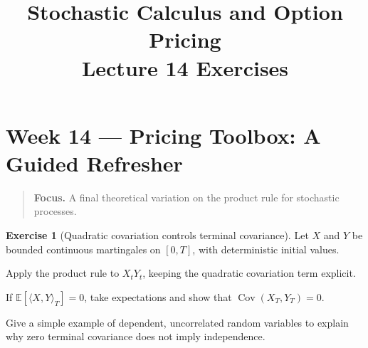 \documentclass[11pt]{article}
\title{Stochastic Calculus and Option Pricing\\Lecture 14 Exercises}
\author{}
\date{}
\newcommand{\E}{\mathbb E}
\theoremstyle{definition}
\newtheorem{exercise}{Exercise}[section]
\newcommand{\lecturesummary}[1]{\begin{quote}\small\textbf{Focus.} #1\end{quote}}
\begin{document}
\maketitle
\vspace{-1.2em}
\setcounter{section}{13}
\fi

\section{Week 14 --- Pricing Toolbox: A Guided Refresher}
\lecturesummary{A final theoretical variation on the product rule for
stochastic processes.}

\begin{exercise}[Quadratic covariation controls terminal covariance]
Let \(X\) and \(Y\) be bounded continuous martingales on \([0,T]\), with
deterministic initial values.
\begin{exparts}
  \item Apply the product rule to \(X_tY_t\), keeping the quadratic
  covariation term explicit.
  \item If \(\E[\langle X,Y\rangle_T]=0\), take expectations and show that
  \(\operatorname{Cov}(X_T,Y_T)=0\).
  \item Give a simple example of dependent, uncorrelated random variables
  to explain why zero terminal covariance does not imply independence.
\end{exparts}
\end{exercise}

\ifdefined\ExercisesSynthesis\else
\end{document}
